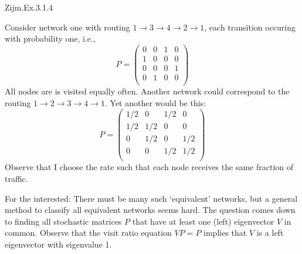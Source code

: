 \begin{exercise}
Zijm.Ex.3.1.4
\begin{solution}
Consider network one with routing $1\to3\to4\to2\to1$, each transition occuring with probability one, i.e.,
\begin{equation*}
  P =
  \begin{pmatrix}
    0 & 0 & 1 & 0  \\
    1 & 0 & 0 & 0  \\
    0 & 0 & 0 & 1  \\
    0 & 1 & 0 & 0  \\
  \end{pmatrix}
\end{equation*}
All nodes are is visited equally often. Another network could correspond to the routing $1\to2\to3\to4\to1$.  Yet another would be this:
\begin{equation*}
  P =
  \begin{pmatrix}
    1/2 & 0   & 1/2 & 0  \\
    1/2 & 1/2 & 0 & 0  \\
    0   & 1/2 & 0 & 1/2  \\
    0   & 0   & 1/2 & 1/2  \\
  \end{pmatrix}
\end{equation*}
Observe that I choose the rate such that each node receives the same
fraction of traffic.

For the interested: There must be many such `equivalent' networks, but
a general method to classify all equivalent networks seems hard. The
question comes down to finding all stochastic matrices $P$ that have
at least one (left) eigenvector $V$ in common. Observe that the visit
ratio equation $VP=P$ implies that $V$ is a left eigenvector with
eigenvalue 1.
\end{solution}
\end{exercise}

